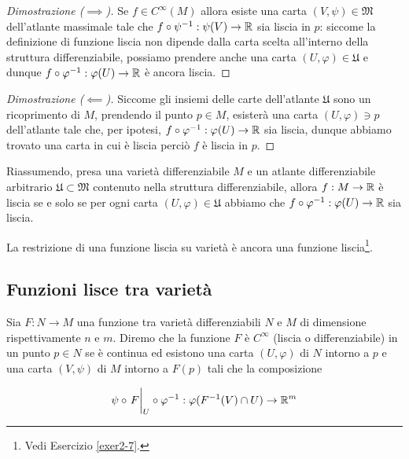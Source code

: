 \begin{proof}[Dimostrazione ($ \implies $)]
	Se $ f \in C^{\infty}(M) $ allora esiste una carta $ (V,\psi) \in \mathfrak{M} $ dell'atlante massimale tale che $ f \circ \psi^{-1} : \psi(V) \to \mathbb{R} $ sia liscia in $ p $: siccome la definizione di funzione liscia non dipende dalla carta scelta all'interno della struttura differenziabile, possiamo prendere anche una carta $ (U,\varphi) \in \mathfrak{U} $ e dunque $ f \circ \varphi^{-1} : \varphi(U) \to \mathbb{R} $ è ancora liscia.
\end{proof}

\begin{proof}[Dimostrazione ($ \impliedby $)]
	Siccome gli insiemi delle carte dell'atlante $ \mathfrak{U} $ sono un ricoprimento di $ M $, prendendo il punto $ p \in M $, esisterà una carta $ (U,\varphi) \ni p $ dell'atlante tale che, per ipotesi, $ f \circ \varphi^{-1} : \varphi(U) \to \mathbb{R} $ sia liscia, dunque abbiamo trovato una carta in cui è liscia perciò $ f $ è liscia in $ p $.
\end{proof}

Riassumendo, presa una varietà differenziabile $ M $ e un atlante differenziabile arbitrario $ \mathfrak{U} \subset \mathfrak{M} $ contenuto nella struttura differenziabile, allora $ f : M \to \mathbb{R} $ è liscia se e solo se per ogni carta $ (U,\varphi) \in \mathfrak{U} $ abbiamo che $ f \circ \varphi^{-1} : \varphi(U) \to \mathbb{R} $ sia liscia.

\begin{remark}
	La restrizione di una funzione liscia su varietà è ancora una funzione liscia\footnote{%
		Vedi Esercizio \ref{exer2-7}.%
	}.
\end{remark}

\subsection{Funzioni lisce tra varietà}

Sia $ F : N \to M $ una funzione tra varietà differenziabili $ N $ e $ M $ di dimensione rispettivamente $ n $ e $ m $. Diremo che la funzione $ F $ è $ C^{\infty} $ (liscia o differenziabile) in un punto $ p \in N $ se è continua ed esistono una carta $ (U,\varphi) $ di $ N $ intorno a $ p $ e una carta $ (V,\psi) $ di $ M $ intorno a $ F(p) $ tali che la composizione

\begin{equation}
	\psi \circ \eval{F}_{U} \circ \varphi^{-1} : \varphi(F^{-1}(V) \cap U) \to \R^{m}
\end{equation}

